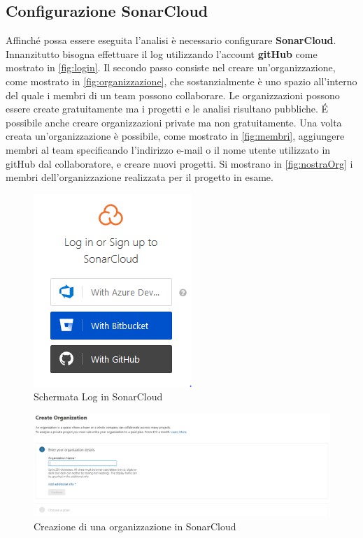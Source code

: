 \subsection{Configurazione SonarCloud}
Affinché possa essere eseguita l'analisi è necessario configurare \textbf{SonarCloud}. Innanzitutto bisogna effettuare il log utilizzando l'account \textbf{gitHub} come mostrato in \autoref{fig:login}. Il secondo passo consiste nel creare un'organizzazione, come mostrato in \autoref{fig:organizzazione}, che sostanzialmente è uno spazio all'interno del quale i membri di un team possono collaborare. Le organizzazioni possono essere create gratuitamente ma i progetti e le analisi risultano pubbliche. \'E possibile anche creare organizzazioni private ma non gratuitamente. Una volta creata un'organizzazione è possibile, come mostrato in \autoref{fig:membri}, aggiungere membri al team specificando l'indirizzo e-mail o il nome utente utilizzato in gitHub dal collaboratore, e creare nuovi progetti. Si mostrano in \autoref{fig:nostraOrg} i membri dell'organizzazione realizzata per il progetto in esame.
\begin{figure}[htbp]
	\centering
	\includegraphics[scale=1, trim = 0cm 0cm 0cm 0cm, clip=true]{figSonarCloud/figLogInSonar.PNG}
	\caption{Schermata Log in SonarCloud}
	\label{fig:login}
\end{figure}

\begin{figure}[htbp]
	\centering
	\includegraphics[scale=0.3, trim = 0cm 0cm 0cm 0cm, clip=true]{figSonarCloud/organizzazione.PNG}
	\caption{Creazione di una organizzazione in SonarCloud}
	\label{fig:organizzazione}
\end{figure}

